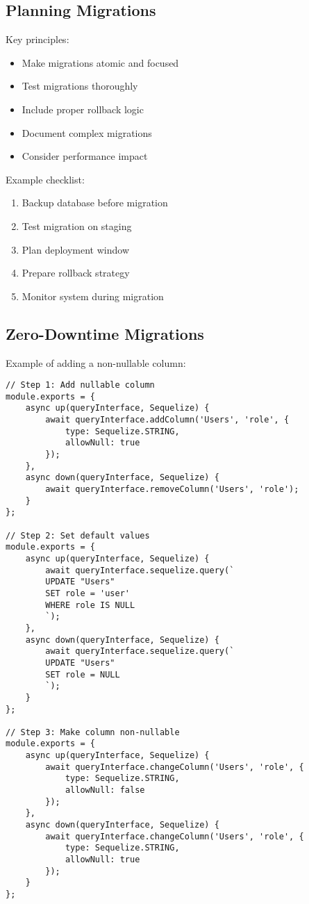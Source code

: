 \documentclass[12pt,a4paper]{book}
\begin{document}
	\subsection{Planning Migrations}
	\begin{tcolorbox}[title=Migration Guidelines]
		Key principles:
		\begin{itemize}
			\item Make migrations atomic and focused
			\item Test migrations thoroughly
			\item Include proper rollback logic
			\item Document complex migrations
			\item Consider performance impact
		\end{itemize}
		
		Example checklist:
		\begin{enumerate}
			\item Backup database before migration
			\item Test migration on staging
			\item Plan deployment window
			\item Prepare rollback strategy
			\item Monitor system during migration
		\end{enumerate}
	\end{tcolorbox}
	
	\subsection{Zero-Downtime Migrations}
		Example of adding a non-nullable column:
		
		\begin{verbatim}
// Step 1: Add nullable column
module.exports = {
	async up(queryInterface, Sequelize) {
		await queryInterface.addColumn('Users', 'role', {
			type: Sequelize.STRING,
			allowNull: true
		});
	},
	async down(queryInterface, Sequelize) {
		await queryInterface.removeColumn('Users', 'role');
	}
};

// Step 2: Set default values
module.exports = {
	async up(queryInterface, Sequelize) {
		await queryInterface.sequelize.query(`
		UPDATE "Users"
		SET role = 'user'
		WHERE role IS NULL
		`);
	},
	async down(queryInterface, Sequelize) {
		await queryInterface.sequelize.query(`
		UPDATE "Users"
		SET role = NULL
		`);
	}
};

// Step 3: Make column non-nullable
module.exports = {
	async up(queryInterface, Sequelize) {
		await queryInterface.changeColumn('Users', 'role', {
			type: Sequelize.STRING,
			allowNull: false
		});
	},
	async down(queryInterface, Sequelize) {
		await queryInterface.changeColumn('Users', 'role', {
			type: Sequelize.STRING,
			allowNull: true
		});
	}
};
		\end{verbatim}
		
\end{document}
